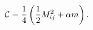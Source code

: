 \begin{equation}
{\cal C}=\frac{1}{4}\left(\frac{1}{2}M_{ij}^2+\alpha
m\right).
\label{calp}
\end{equation}

